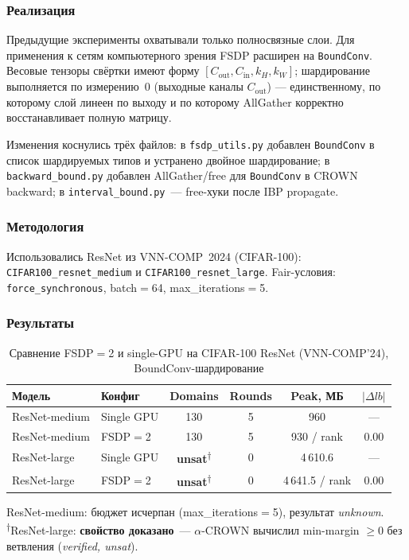 \subsubsection{Реализация}

Предыдущие эксперименты охватывали только полносвязные слои.
Для применения к сетям компьютерного зрения FSDP расширен
на \texttt{BoundConv}.
Весовые тензоры свёртки имеют форму
$[C_\text{out}, C_\text{in}, k_H, k_W]$; шардирование выполняется
по измерению~$0$ (выходные каналы $C_\text{out}$) --- единственному,
по которому слой линеен по выходу и по которому AllGather корректно
восстанавливает полную матрицу.

Изменения коснулись трёх файлов:
в \texttt{fsdp\_utils.py} добавлен \texttt{BoundConv} в список
шардируемых типов и устранено двойное шардирование;
в \texttt{backward\_bound.py} добавлен AllGather/free для
\texttt{BoundConv} в CROWN backward;
в \texttt{interval\_bound.py}~--- free-хуки после IBP propagate.

\subsubsection{Методология}

Использовались ResNet из VNN-COMP~2024 (CIFAR-100):
\texttt{CIFAR100\_resnet\_medium} и \texttt{CIFAR100\_resnet\_large}.
Fair-условия: \texttt{force\_synchronous}, batch$=$64,
max\_iterations$=$5.

\subsubsection{Результаты}

\begin{table}[htbp]
\centering
\caption{Сравнение FSDP$=$2 и single-GPU
на CIFAR-100 ResNet (VNN-COMP'24), BoundConv-шардирование}
\label{tab:fsdp-conv}
\begin{tabular}{llcccc}
\toprule
Модель & Конфиг & Domains & Rounds & Peak, МБ & $|\Delta lb|$ \\
\midrule
ResNet-medium & Single GPU & 130 & 5 &   960 & --- \\
ResNet-medium & FSDP$=$2   & 130 & 5 &   930 / rank & 0.00 \\
ResNet-large  & Single GPU & \textbf{unsat}\textsuperscript{†} & 0 & 4\,610.6 & --- \\
ResNet-large  & FSDP$=$2   & \textbf{unsat}\textsuperscript{†} & 0 & 4\,641.5 / rank & 0.00 \\
\bottomrule
\end{tabular}
\end{table}
ResNet-medium: бюджет исчерпан (max\_iterations$=$5),
результат \emph{unknown}.
\textsuperscript{†}ResNet-large: \textbf{свойство доказано}~---
$\alpha$-CROWN вычислил min-margin $\ge 0$ без ветвления
(\emph{verified, unsat}).

